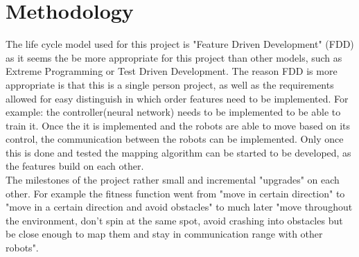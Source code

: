 \section{Methodology}
The life cycle model used for this project is "Feature Driven Development" (FDD) as it seems the be more appropriate for this project than other models, such as Extreme Programming or Test Driven Development. 
The reason FDD is more appropriate is that this is a single person project, as well as the requirements allowed for easy distinguish in which order features need to be implemented.  
For example: the controller(neural network) needs to be implemented to be able to train it. Once the it is implemented and the robots are able to move based on its control, the communication between the robots can be implemented. Only once this is done and tested the mapping algorithm can be started to be developed, as the features build on each other.\\

The milestones of the project rather small and incremental "upgrades" on each other. For example the fitness function went from "move in certain direction" to "move in a certain direction and avoid obstacles" to much later "move throughout the environment, don't spin at the same spot, avoid crashing into obstacles but be close enough to map them and stay in communication range with other robots". \\
 


